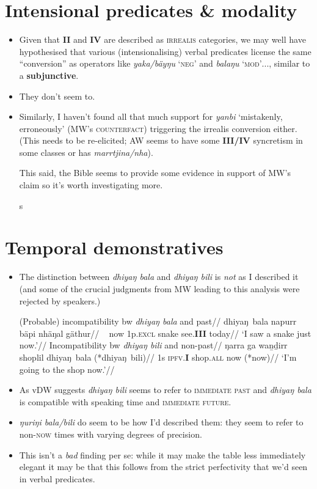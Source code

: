 \documentclass[11pt]{article}
\begin{document}
\section{Intensional predicates \& modality}
\begin{itemize}
 	\item Given that \textbf{II} and \textbf{IV} are described as \textsc{irrealis} categories, we may well have hypothesised that various (intensionalising) verbal predicates license the same ``conversion'' as operators like \textit{yaka/bäyŋu} `\textsc{neg}' and \textit{balaŋu} `\textsc{mod'}..., similar to a \textbf{subjunctive}.
 	\item They don't seem to.
 	\item Similarly, I haven't found all that much support for \textit{yanbi} `mistakenly, erroneously' (MW's \textsc{counterfact}) triggering the irrealis conversion either. (This needs to be re-elicited; AW seems to have some \textbf{III/IV} syncretism in some classes or has \textit{marrtjina/nha}).
 	
 	This said, the Bible seems to provide some evidence in support of MW's claim so it's worth investigating more.
 	
 	s
 \pex\a%
 
 
 \xe
\end{itemize}






\section{Temporal demonstratives}
\begin{itemize}
	\item The distinction between \textit{dhiyaŋ bala} and \textit{dhiyaŋ bili} is \textit{not} as I described it (and some of the crucial judgments from MW leading to this analysis were rejected by speakers.)
	
	\pex\a\begingl\glpreamble (Probable) incompatibility bw \textit{dhiyaŋ bala} and past//
	\gla {} dhiyaŋ~bala napurr bäpi nhäŋal gäthur//
	\glb ~ now 1p.\textsc{excl} snake see.\textbf{III} today//
	\glft `I saw a snake just now.'\trailingcitation{[AW20190409]}//\endgl
	\a\begingl\glpreamble Incompatibility bw \textit{dhiyaŋ bili} and non-past//
	\gla ŋarra ga waṉḏirr shoplil dhiyaŋ~bala (*dhiyaŋ~bili)//
	\glb 1s \textsc{ipfv}.\textbf{I} shop\textsc{.all} now (*now)//
	\glft`I'm going to the shop now.'\trailingcitation{[AW20190409]}//\endgl
	\xe
	\item As vDW suggests \textit{dhiyaŋ bili} seems to refer to \textsc{immediate past} and \textit{dhiyaŋ bala} is compatible with speaking time and \textsc{immediate future}.
	\item \textit{ŋuriŋi bala/bili} do seem to be how I'd described them: they seem to refer to non-\textsc{now} times with varying degrees of precision.
	\item This isn't a \textit{bad} finding per se: while it may make the table less immediately elegant it may be that this follows from the strict perfectivity that we'd seen in verbal predicates.
\end{itemize}
\end{document}
